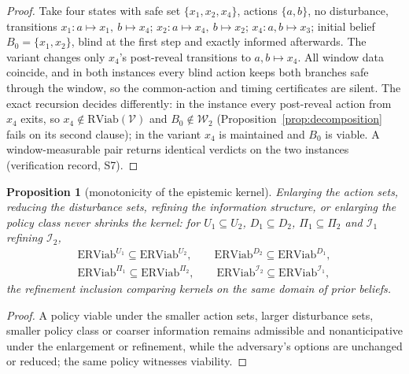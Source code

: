 \documentclass[11pt,a4paper]{article}
\theoremstyle{plain}
\newtheorem{proposition}[theorem]{Proposition}
\theoremstyle{definition}
\theoremstyle{remark}
\newcommand{\RViab}{\mathrm{RViab}}
\newcommand{\ERViab}{\mathrm{ERViab}}
\newcommand{\cV}{\mathcal{V}}
\newcommand{\cI}{\mathcal{I}}
\newcommand{\cW}{\mathcal{W}}
\begin{document}
\begin{proof}
Take four states with safe set $\{x_1,x_2,x_4\}$, actions $\{a,b\}$, no disturbance, transitions $x_1\colon a\mapsto x_1,\ b\mapsto x_4$; $x_2\colon a\mapsto x_4,\ b\mapsto x_2$; $x_4\colon a,b\mapsto x_3$; initial belief $B_0=\{x_1,x_2\}$, blind at the first step and exactly informed afterwards. The variant changes only $x_4$'s post-reveal transitions to $a,b\mapsto x_4$. All window data coincide, and in both instances every blind action keeps both branches safe through the window, so the common-action and timing certificates are silent. The exact recursion decides differently: in the instance every post-reveal action from $x_4$ exits, so $x_4\notin\RViab(\cV)$ and $B_0\notin\cW_2$ (Proposition~\ref{prop:decomposition} fails on its second clause); in the variant $x_4$ is maintained and $B_0$ is viable. A window-measurable pair returns identical verdicts on the two instances (verification record, S7).
\end{proof}

\begin{proposition}[monotonicity of the epistemic kernel]\label{prop:monotone}
Enlarging the action sets, reducing the disturbance sets, refining the information structure, or enlarging the policy class never shrinks the kernel: for $U_1\subseteq U_2$, $D_1\subseteq D_2$, $\Pi_1\subseteq\Pi_2$ and $\cI_1$ refining $\cI_2$,
\[
\begin{gathered}
\ERViab^{U_1}\subseteq\ERViab^{U_2},\qquad \ERViab^{D_2}\subseteq\ERViab^{D_1},\\
\ERViab^{\Pi_1}\subseteq\ERViab^{\Pi_2},\qquad \ERViab^{\cI_2}\subseteq\ERViab^{\cI_1},
\end{gathered}
\]
the refinement inclusion comparing kernels on the same domain of prior beliefs.
\end{proposition}

\begin{proof}
A policy viable under the smaller action sets, larger disturbance sets, smaller policy class or coarser information remains admissible and nonanticipative under the enlargement or refinement, while the adversary's options are unchanged or reduced; the same policy witnesses viability.
\end{proof}
\end{document}
